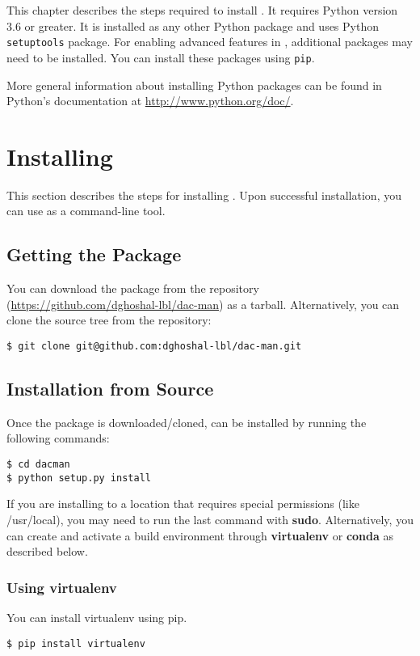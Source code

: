 This chapter describes the steps required to install \systemname.
It requires Python version 3.6 or greater. It is installed
as any other Python package and uses Python \texttt{setuptools}
package. For enabling advanced features in \systemname, additional
packages may need to be installed. You can install these packages
using \texttt{pip}. 

More general information about installing Python packages can be
found in Python's documentation at \url{http://www.python.org/doc/}.

\section{Installing \systemname}
This section describes the steps for installing \systemname. Upon
successful installation, you can use \systemname as a command-line
tool. 

\subsection{Getting the Package}
You can download the package from the \systemname repository
(\url{https://github.com/dghoshal-lbl/dac-man}) as a tarball.
Alternatively, you can clone the source tree from the repository:

\texttt{\$ git clone git@github.com:dghoshal-lbl/dac-man.git}

\subsection{Installation from Source}
Once the package is downloaded/cloned, \systemname can be installed
by running the following commands:

\texttt{\$ cd dacman}\\
\texttt{\$ python setup.py install}

If you are installing to a location that requires special permissions
(like /usr/local), you may need to run the last command with \textbf{sudo}.
Alternatively, you can create and activate a build environment through
\textbf{virtualenv} or \textbf{conda} as described below.

\subsubsection{Using virtualenv}
You can install virtualenv using pip. 

\texttt{\$ pip install virtualenv}

